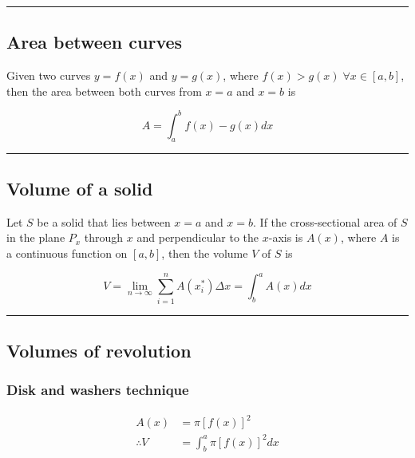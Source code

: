 \documentclass[
  landscape,  
  10pt,
]{article}
\begin{document}
\begin{multicols}{3}
\begin{center}\rule{0.5\linewidth}{0.5pt}\end{center}

\hypertarget{area-between-curves}{%
\subsection{Area between curves}\label{area-between-curves}}

Given two curves \(y = f(x)\) and \(y = g(x)\), where
\(f(x) > g(x) \;\forall x \in [a,b]\), then the area between both curves
from \(x=a\) and \(x=b\) is

\[ A = \int_a^b f(x)-g(x)dx \]

\begin{center}\rule{0.5\linewidth}{0.5pt}\end{center}

\hypertarget{volume-of-a-solid}{%
\subsection{Volume of a solid}\label{volume-of-a-solid}}

Let \(S\) be a solid that lies between \(x=a\) and \(x=b\). If the
cross-sectional area of \(S\) in the plane \(P_x\) through \(x\) and
perpendicular to the \(x\)-axis is \(A(x)\), where \(A\) is a continuous
function on \([a,b]\), then the volume \(V\) of \(S\) is

\[ V = \lim_{n \to\infty} \sum_{i=1}^n A(x_i^*)\Delta x = \int_b^a A(x)dx \]

\begin{center}\rule{0.5\linewidth}{0.5pt}\end{center}

\hypertarget{volumes-of-revolution}{%
\subsection{Volumes of revolution}\label{volumes-of-revolution}}

\hypertarget{disk-and-washers-technique}{%
\subsubsection{Disk and washers
technique}\label{disk-and-washers-technique}}

\begin{align*}
A(x) &= \pi [f(x)]^2 \\
\therefore V &=  \int_b^a \pi [f(x)]^2dx 
\end{align*}


\end{multicols}
\end{document}
